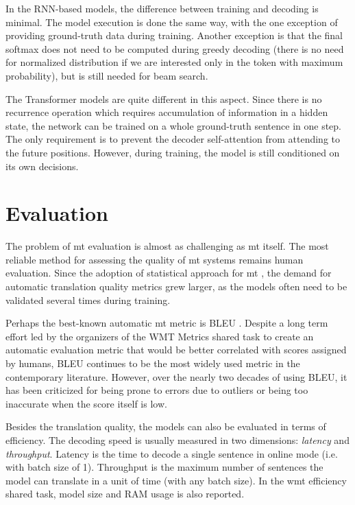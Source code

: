 In the RNN-based models, the difference between training and decoding is
minimal. The model execution is done the same way, with the one exception of
providing ground-truth data during training. Another exception is that the final
softmax does not need to be computed during greedy decoding (there is no need
for normalized distribution if we are interested only in the token with maximum
probability), but is still needed for beam search.

The Transformer models are quite different in this aspect. Since there is no
recurrence operation which requires accumulation of information in a hidden
state, the network can be trained on a whole ground-truth sentence in one step.
The only requirement is to prevent the decoder self-attention from attending to
the future positions. However, during training, the model is still conditioned
on its own decisions. 




\section{Evaluation}
\label{sec:evaluation}

The problem of \ac{mt} evaluation is almost as challenging as \ac{mt} itself.
The most reliable method for assessing the quality of \ac{mt} systems remains
human evaluation.  Since the adoption of statistical approach for \ac{mt}
\citep{brown-etal-1993-mathematics,koehn-etal-2003-statistical}, the demand for
automatic translation quality metrics grew larger, as the models often need to
be validated several times during training.

Perhaps the best-known automatic \ac{mt} metric is BLEU
\citep{papineni-etal-2002-bleu}.  Despite a long term effort led by the
organizers of the WMT Metrics shared task to create an automatic evaluation
metric that would be better correlated with scores assigned by humans, BLEU
continues to be the most widely used metric in the contemporary
literature. However, over the nearly two decades of using BLEU, it has been
criticized for being prone to errors due to outliers or being too inaccurate
when the score itself is low.
\citep{callison-burch-etal-2006-evaluating,bojar-etal-2010-tackling,reiter2018structured,mathur-etal-2020-tangled}

Besides the translation quality, the models can also be evaluated in terms of
efficiency. The decoding speed is usually measured in two dimensions:
\emph{latency} and \emph{throughput}. Latency is the time to decode a single
sentence in online mode (i.e. with batch size of 1). Throughput is the maximum
number of sentences the model can translate in a unit of time (with any batch
size). In the \ac{wmt} efficiency shared task, model size and RAM usage is also
reported.



